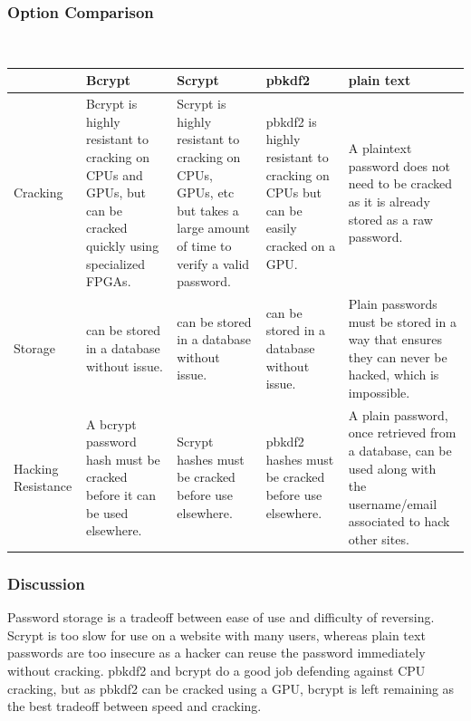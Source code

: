 \documentclass[onecolumn, draftclsnofoot,10pt, compsoc]{IEEEtran}
\begin{document}
{{ \par}

\newpage
\subsubsection{Option Comparison} ~\\

\tablehead{}
\begin{supertabular}{|p{2.5cm}|p{3.3cm}|p{3.3cm}|p{3.3cm}|p{3.3cm}|}
\hline
	& Bcrypt
	& Scrypt
	& pbkdf2
	& plain text \\ 
\hline
	Cracking
	& Bcrypt is highly resistant to cracking on CPUs and GPUs, 
  		but can be cracked quickly using specialized FPGAs.
	& Scrypt is highly resistant to cracking on CPUs, GPUs, etc but 
  		takes a large amount of time to verify a valid password.
	& pbkdf2 is highly resistant to cracking on CPUs but can be easily cracked on a GPU.
	& A plaintext password does not need to be cracked as it is already stored as a raw password. \\ 
\hline
	Storage
	& can be stored in a database without issue.
	& can be stored in a database without issue.
	& can be stored in a database without issue.
  	& Plain passwords must be stored in a way that ensures they can 
  		never be hacked, which is impossible. \\ 
\hline
	Hacking \hspace{3em} Resistance
  	& A bcrypt password hash must be cracked before it can be used elsewhere.
  	& Scrypt hashes must be cracked before use elsewhere.
  	& pbkdf2 hashes must be cracked before use elsewhere.
  	& A plain password, once retrieved from a database, can be used along with 
  		the username/email associated to hack other sites. \\ 
\hline
\end{supertabular}

\medskip

\subsubsection{Discussion} 
\noindent
Password storage is a tradeoff between ease of use and difficulty of reversing. 
Scrypt is too slow for use on a website with many users, whereas plain text passwords are 
too insecure as a hacker can reuse the password immediately without cracking. pbkdf2 and 
bcrypt do a good job defending against CPU cracking, but as pbkdf2 can be cracked using a 
GPU, bcrypt is left remaining as the best tradeoff between speed and cracking.


}
\end{document}
